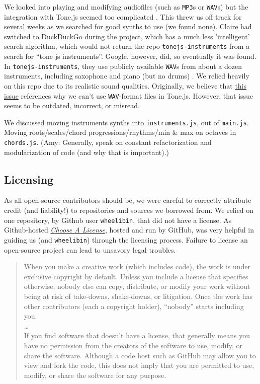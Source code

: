 \documentclass[12pt,a4paper]{article}
\newcommand{\code}{\texttt}
\newcommand{\lightcode}[1]{\colorbox{light-gray}{\texttt{#1}}}
\begin{document}
We looked into playing and modifying audiofiles (such as \code{MP3}s or \code{WAV}s) but the integration with Tone.js seemed too complicated \cite{tonejs-issue}. This threw us off track for several weeks as we searched for good synths to use (we found none). Claire had switched to \href{https://duckduckgo.com/}{DuckDuckGo} during the project, which has a much less 'intelligent' search algorithm, which would not return the repo \lightcode{tonejs-instruments} from a search for ``tone js instruments''. Google, however, did, so eventually it was found. In \lightcode{tonejs-instruments}, they use publicly available \code{WAV}s from about a dozen instruments, including saxophone and piano (but no drums) \cite{tonejs-instruments}.  We relied heavily on this repo due to its realistic sound qualities. Originally, we believe that \href{https://github.com/Tonejs/Tone.js/issues/290}{this issue} references why we can't use \code{WAV}-format files in Tone.js. However, that issue seems to be outdated, incorrect, or misread.

We discussed moving instruments synths into \lightcode{instruments.js}, out of \lightcode{main.js}. Moving roots/scales/chord progressions/rhythms/min \& max on octaves in \lightcode{chords.js}. (Amy: Generally, speak on constant refactorization and modularization of code (and why that is important).)

\subsection{Licensing}

As all open-source contributors should be, we were careful to correctly attribute credit (and liability!) to repositories and sources we borrowed from. We relied on one repository, by Github user \code{wheelibin}, that did not have a license. As Github-hosted \href{https://choosealicense.com/}{\textit{Choose A License}}, hosted and run by GitHub, was very helpful in guiding us (and \code{wheelibin}) through the licensing process. Failure to license an open-source project can lead to unsavory legal troubles.

\begin{quote}
When you make a creative work (which includes code), the work is under exclusive copyright by default. Unless you include a license that specifies otherwise, nobody else can copy, distribute, or modify your work without being at risk of take-downs, shake-downs, or litigation. Once the work has other contributors (each a copyright holder), “nobody” starts including you. \\
\dots \\
If you find software that doesn’t have a license, that generally means you have no permission from the creators of the software to use, modify, or share the software. Although a code host such as GitHub may allow you to view and fork the code, this does not imply that you are permitted to use, modify, or share the software for any purpose. \cite{choose-license-none}
\end{quote}
\end{document}
